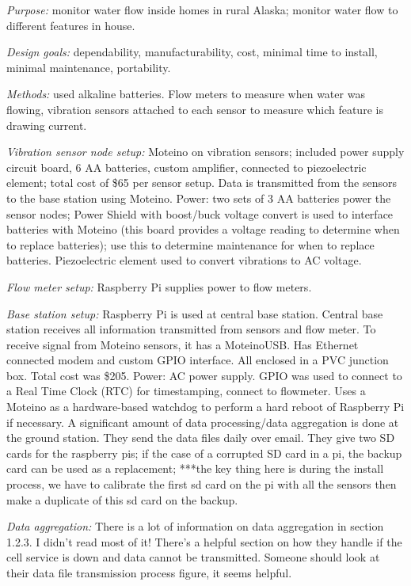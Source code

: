 \documentclass[12pt, letterpaper]{article}
\begin{document}
\textit{Purpose:} monitor water flow inside homes in rural Alaska; monitor water flow to different features in house.
%

\textit{Design goals:} dependability, manufacturability, cost, minimal time to install, minimal maintenance, portability.
%

\textit{Methods:} used alkaline batteries. Flow meters to measure when water was flowing, vibration sensors attached to each
sensor to measure which feature is drawing current.
%

\textit{Vibration sensor node setup:} Moteino on vibration sensors; included power supply circuit board, 6 AA batteries,
custom amplifier, connected to piezoelectric element; total cost of \$65 per sensor setup. Data is transmitted from
the sensors to the base station using Moteino.
%
Power: two sets of 3 AA batteries power the sensor nodes; Power Shield with boost/buck voltage convert is used
to interface batteries with Moteino (this board provides a voltage reading to determine when to replace batteries);
use this to determine maintenance for when to replace batteries.
%
Piezoelectric element used to convert vibrations to AC voltage.

\textit{Flow meter setup:} Raspberry Pi supplies power to flow meters.
%

\textit{Base station setup:} Raspberry Pi is used at central base station.
%
Central base station receives all information transmitted from sensors and flow meter.
%
To receive signal from Moteino sensors, it has a MoteinoUSB.
%
Has Ethernet connected modem and custom GPIO interface.
%
All enclosed in a PVC junction box.
%
Total cost was \$205.
%
Power: AC power supply.
%
GPIO was used to connect to a Real Time Clock (RTC) for timestamping, connect to flowmeter.
%
Uses a Moteino as a hardware-based watchdog to perform a hard reboot of Raspberry Pi if necessary.
%
A significant amount of data processing/data aggregation is done at the ground station.
%
They send the data files daily over email.
%
They give two SD cards for the raspberry pis; if the case of a corrupted SD card in a pi, the backup
card can be used as a replacement; ***the key thing here is during the install process, we have to
calibrate the first sd card on the pi with all the sensors then make a duplicate of this sd card
on the backup.

\textit{Data aggregation:} There is a lot of information on data aggregation in section 1.2.3.
%
I didn't read most of it!
%
There's a helpful section on how they handle if the cell service is down and data cannot be transmitted.
%
Someone should look at their data file transmission process figure, it seems helpful.
\end{document}
